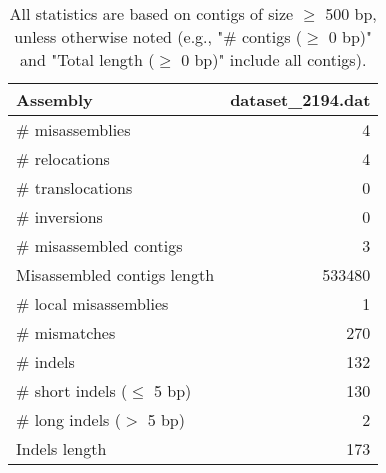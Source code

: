 \documentclass[12pt,a4paper]{article}
\begin{document}
\begin{table}[ht]
\begin{center}
\caption{All statistics are based on contigs of size $\geq$ 500 bp, unless otherwise noted (e.g., "\# contigs ($\geq$ 0 bp)" and "Total length ($\geq$ 0 bp)" include all contigs).}
\begin{tabular}{|l*{1}{|r}|}
\hline
Assembly & dataset\_2194.dat \\ \hline
\# misassemblies & 4 \\ \hline
\hspace{5mm}\# relocations & 4 \\ \hline
\hspace{5mm}\# translocations & 0 \\ \hline
\hspace{5mm}\# inversions & 0 \\ \hline
\# misassembled contigs & 3 \\ \hline
Misassembled contigs length & 533480 \\ \hline
\# local misassemblies & 1 \\ \hline
\# mismatches & 270 \\ \hline
\# indels & 132 \\ \hline
\hspace{5mm}\# short indels ($\leq$ 5 bp) & 130 \\ \hline
\hspace{5mm}\# long indels ($>$ 5 bp) & 2 \\ \hline
Indels length & 173 \\ \hline
\end{tabular}
\end{center}
\end{table}
\end{document}
